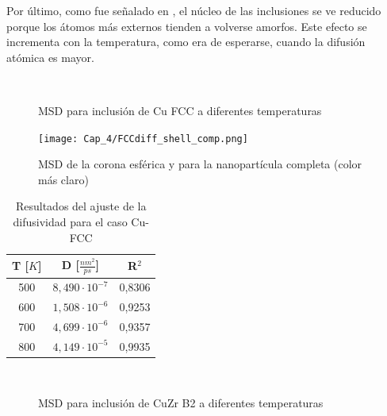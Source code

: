 Por último, como fue señalado en \cite{albe13}, el núcleo de las inclusiones se ve reducido porque los átomos más externos tienden a volverse amorfos. Este efecto se incrementa con la temperatura, como era de esperarse, cuando la difusión atómica es mayor.

\begin{figure}[htp]
\centering
{}
\\
\caption[MSD para inclusión de Cu FCC a diferentes temperaturas]{MSD para inclusión de Cu FCC a diferentes temperaturas}
\label{C4:fg:msd_Cu_FCC}
\end{figure}

\begin{figure}[htp]
\centering
\texttt{[image: Cap\_4/FCCdiff\_shell\_comp.png]}
\caption[MSD de la corona esférica y la nanopartícula completa]{MSD de la corona esférica y para la nanopartícula completa (color más claro)}
\label{C4:fg:FCCdiff_shell_comp}
\end{figure}

\begin{table}[htp]
\begin{center}
\begin{tabular}{*{3}{c}}
\hline
T [$K$] & D [$\frac{nm^{2}}{ps}$] & R$^{2}$ \\
\hline \hline
500 & $8,490\cdot 10^{-7}$ & 0,8306 \\
\hline
600 & $1,508\cdot 10^{-6}$ & 0,9253 \\
\hline
700 & $4,699\cdot 10^{-6}$ & 0,9357 \\
\hline
800 & $4,149\cdot 10^{-5}$ & 0,9935 \\
\hline
\end{tabular}
\end{center}
\caption{Resultados del ajuste de la difusividad para el caso Cu-FCC}
\label{C4:tb:FCC_Diff_Fit_Restults}
\end{table}

\begin{figure}[htp]
\centering
{}
\\
\caption[MSD para inclusión de CuZr B2 a diferentes temperaturas]{MSD para inclusión de CuZr B2 a diferentes temperaturas}
\label{C4:fg:msd_CuZr_B2}
\end{figure}

